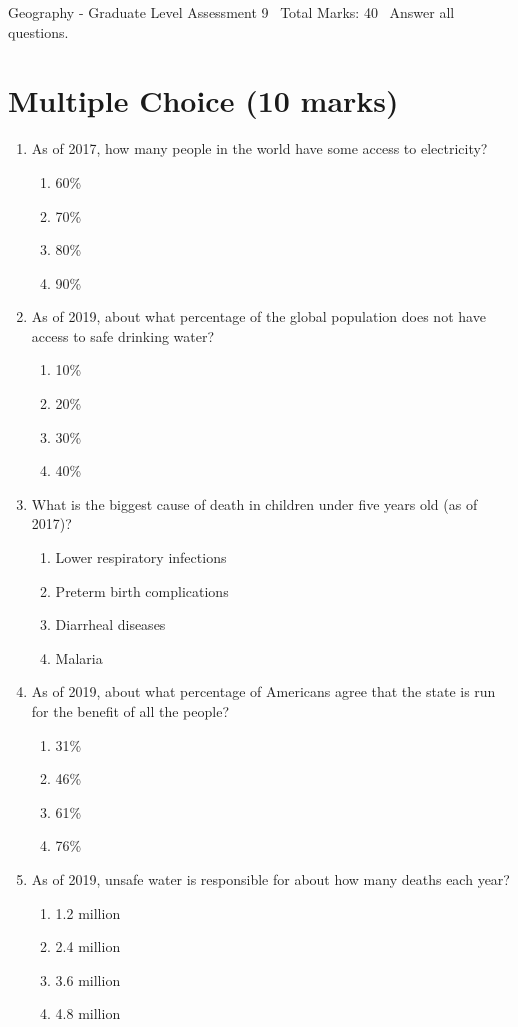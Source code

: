 \documentclass[12pt]{article}
\begin{document}
\begin{center}
Geography - Graduate Level Assessment 9 \
Total Marks: 40 \
Answer all questions.
\end{center}

\section*{Multiple Choice (10 marks)}
\begin{enumerate}[label=\arabic*.]
\item As of 2017, how many people in the world have some access to electricity?
\begin{enumerate}[label=(\alph*)]
    \item 60\%
    \item 70\%
    \item 80\%
    \item 90\%
\end{enumerate}
\item As of 2019, about what percentage of the global population does not have access to safe drinking water?
\begin{enumerate}[label=(\alph*)]
    \item 10\%
    \item 20\%
    \item 30\%
    \item 40\%
\end{enumerate}
\item What is the biggest cause of death in children under five years old (as of 2017)?
\begin{enumerate}[label=(\alph*)]
    \item Lower respiratory infections
    \item Preterm birth complications
    \item Diarrheal diseases
    \item Malaria
\end{enumerate}
\item As of 2019, about what percentage of Americans agree that the state is run for the benefit of all the people?
\begin{enumerate}[label=(\alph*)]
    \item 31\%
    \item 46\%
    \item 61\%
    \item 76\%
\end{enumerate}
\item As of 2019, unsafe water is responsible for about how many deaths each year?
\begin{enumerate}[label=(\alph*)]
    \item 1.2 million
    \item 2.4 million
    \item 3.6 million
    \item 4.8 million
\end{enumerate}
\end{enumerate}
\end{document}
